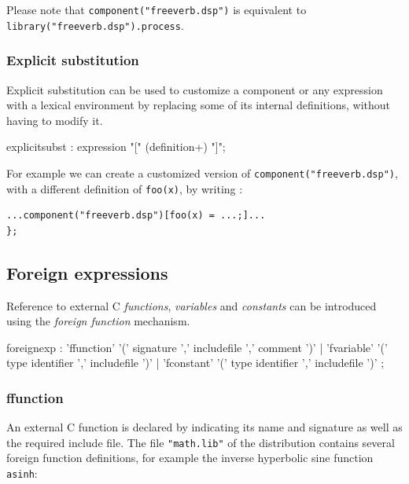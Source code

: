\documentclass[a4paper,10pt]{book}
\begin{document}
 Please note that \lstinline'component("freeverb.dsp")' is equivalent to \lstinline'library("freeverb.dsp").process'.


\subsubsection{Explicit substitution} 

Explicit substitution can be used to customize a component or any expression with a lexical environment by replacing some of its internal definitions, without having to modify it.


\begin{rail}
explicitsubst : expression "[" (definition+) "]";
\end{rail}

For example we can create a customized version of \lstinline'component("freeverb.dsp")', with a different definition of \lstinline'foo(x)', by writing :
\begin{lstlisting}
...component("freeverb.dsp")[foo(x) = ...;]...
};
\end{lstlisting}


\subsection{Foreign expressions}

Reference to external C \textit{functions}, \textit{variables} and \textit{constants} can be introduced using the \textit{foreign function} mechanism.
 
\begin{rail}
foreignexp : 'ffunction' '(' signature ',' includefile ',' comment ')' 
          | 'fvariable' '(' type identifier ',' includefile ')' 
          | 'fconstant' '(' type identifier ',' includefile ')' ;
\end{rail}


\subsubsection{ffunction} 
An external C function is declared by indicating its name and signature as well as the required include file.
The file \lstinline'"math.lib"' of the \faust distribution contains several foreign function definitions, for example the inverse hyperbolic sine function \lstinline'asinh':
\end{document}
